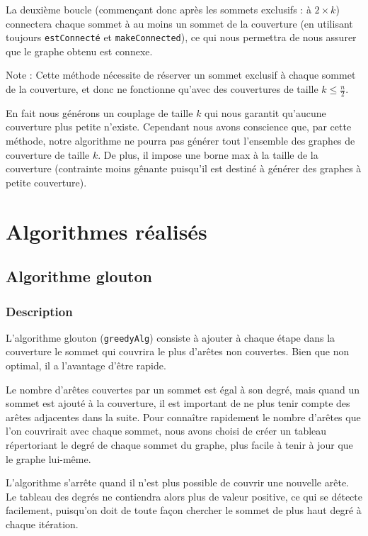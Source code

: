 \documentclass[a4paper,10pt]{article}
\begin{document}
\bigskip
La deuxième boucle (commençant donc après les sommets exclusifs : à $2\times k$) connectera chaque sommet à au moins un sommet de la couverture (en utilisant toujours \texttt{estConnecté} et \texttt{makeConnected}), ce qui nous permettra de nous assurer que le graphe obtenu est connexe.
\bigskip

Note : Cette méthode nécessite de réserver un sommet exclusif à chaque sommet de la couverture, et donc ne fonctionne qu'avec des couvertures de taille $k\leqslant \frac n 2$.

En fait nous générons un couplage de taille $k$ qui nous garantit qu'aucune couverture plus petite n'existe. Cependant nous avons conscience que, par cette méthode, notre algorithme ne pourra pas générer tout l'ensemble des graphes de couverture de taille $k$. De plus, il impose une borne max à la taille de la couverture (contrainte moins gênante puisqu'il est destiné à générer des graphes à petite couverture).

\section{Algorithmes réalisés}

\subsection{Algorithme glouton}

\subsubsection{Description}

L'algorithme glouton (\texttt{greedyAlg}) consiste à ajouter à chaque étape dans la couverture le sommet qui couvrira le plus d'arêtes non couvertes. Bien que non optimal, il a l'avantage d'être rapide. 

Le nombre d'arêtes couvertes par un sommet est égal à son degré, mais quand un sommet est ajouté à la couverture, il est important de ne plus tenir compte des arêtes adjacentes dans la suite. Pour connaître rapidement le nombre d'arêtes que l'on couvrirait avec chaque sommet, nous avons choisi de créer un tableau répertoriant le degré de chaque sommet du graphe, plus facile à tenir à jour que le graphe lui-même. 

L'algorithme s'arrête quand il n'est plus possible de couvrir une nouvelle arête. Le tableau des degrés ne contiendra alors plus de valeur positive, ce qui se détecte facilement, puisqu'on doit de toute façon chercher le sommet de plus haut degré à chaque itération.
\end{document}
